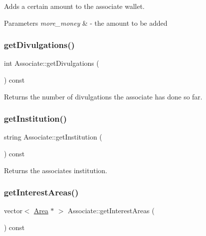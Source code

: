 Adds a certain amount to the associate wallet. 


\begin{DoxyParams}{Parameters}
{\em more\+\_\+money} & -\/ the amount to be added \\
\hline
\end{DoxyParams}
\mbox{\label{classAssociate_a2ee36cec1d42559fdd1f9afe7ff85b2b}} 
\subsubsection{\texorpdfstring{get\+Divulgations()}{getDivulgations()}}
{\footnotesize\ttfamily int Associate\+::get\+Divulgations (\begin{DoxyParamCaption}{ }\end{DoxyParamCaption}) const}



Returns the number of divulgations the associate has done so far. 

\mbox{\label{classAssociate_acef0ddff899cbca55e3b19abc67f1800}} 
\subsubsection{\texorpdfstring{get\+Institution()}{getInstitution()}}
{\footnotesize\ttfamily string Associate\+::get\+Institution (\begin{DoxyParamCaption}{ }\end{DoxyParamCaption}) const}



Returns the associate\textquotesingle{}s institution. 

\mbox{\label{classAssociate_ac53645c77c48f2439dc3a5f8eb9ef530}} 
\subsubsection{\texorpdfstring{get\+Interest\+Areas()}{getInterestAreas()}}
{\footnotesize\ttfamily vector$<$ \hyperlink{classArea}{Area} $\ast$ $>$ Associate\+::get\+Interest\+Areas (\begin{DoxyParamCaption}{ }\end{DoxyParamCaption}) const}



